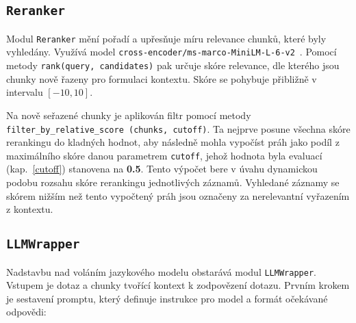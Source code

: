 \subsection{\texttt{Reranker}}
\label{reranker}
Modul \texttt{Reranker} mění pořadí a upřesňuje míru relevance chunků, které byly vyhledány. Využívá model \texttt{cross-encoder/ms-marco-MiniLM-L-6-v2}~\cite{crossencoder}. Pomocí metody \texttt{rank(query, candidates)} pak určuje skóre relevance, dle kterého jsou chunky nově řazeny pro formulaci kontextu. Skóre se pohybuje přibližně v intervalu $[-10, 10]$.

Na nově seřazené chunky je aplikován filtr pomocí metody \texttt{filter\_by\_relative\_score (chunks, cutoff)}. Ta nejprve posune všechna skóre rerankingu do kladných hodnot, aby následně mohla vypočíst práh jako podíl z maximálního skóre danou parametrem \texttt{cutoff}, jehož hodnota byla evaluací (kap.~\ref{cutoff}) stanovena na \textbf{0.5}. Tento výpočet bere v úvahu dynamickou podobu rozsahu skóre rerankingu jednotlivých záznamů. Vyhledané záznamy se skórem nižším než tento vypočtený práh jsou označeny za nerelevantní vyřazením z kontextu.

\subsection{\texttt{LLMWrapper}}
\label{llmwrapper}
Nadstavbu nad voláním jazykového modelu obstarává modul \texttt{LLMWrapper}. Vstupem je dotaz a chunky tvořící kontext k zodpovězení dotazu. Prvním krokem je sestavení promptu, který definuje instrukce pro model a formát očekávané odpovědi:

